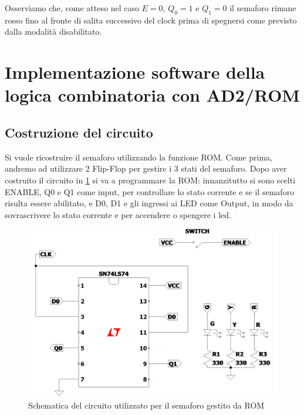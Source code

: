 \documentclass[10pt, a4paper, italian]{article}
\begin{document}
Osserviamo che, come atteso nel caso $E = 0$, $Q_0 = 1$ e $Q_1 = 0$ il
semaforo rimane rosso fino al fronte di salita successivo del clock prima
di spegnersi come previsto dalla modalità disabilitato.

\section{Implementazione software della logica combinatoria con AD2/ROM}
\subsection{Costruzione del circuito}
Si vuole ricostruire il semaforo utilizzando la funzione ROM.
Come prima, andremo ad utilizzare 2 Flip-Flop per gestire i 3 stati del semaforo.
Dopo aver costruito il circuito in \cref{schem: rom} si va a programmare la ROM: innanzitutto si sono scelti ENABLE, Q0 e Q1 come input, per controllare lo stato corrente e se il semaforo risulta essere abilitato, e D0, D1 e gli ingressi ai LED come Output, in modo da sovrascrivere lo stato corrente e per accendere o spengere i led.
\begin{figure}[htbp]
    \centering
    \includegraphics[width=\textwidth]{schem_rom}
    \caption{Schematica del circuito utilizzato per il semaforo gestito da ROM
    \label{schem: rom}}
\end{figure}
\end{document}
